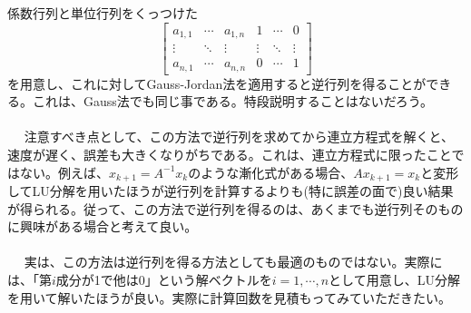 係数行列と単位行列をくっつけた
\begin{equation}
\left[
\begin{array}{ccc|ccc}
a_{1,1}&\cdots&a_{1,n}&1&\cdots&0\\
\vdots&\ddots&\vdots&\vdots&\ddots&\vdots\\
a_{n,1}&\cdots&a_{n,n}&0&\cdots&1
\end{array}\right]
\end{equation}
を用意し、これに対してGauss-Jordan法を適用すると逆行列を得ることができる。これは、Gauss法でも同じ事である。特段説明することはないだろう。
\\ \\　
注意すべき点として、この方法で逆行列を求めてから連立方程式を解くと、速度が遅く、誤差も大きくなりがちである。これは、連立方程式に限ったことではない。例えば、$x_{k+1}=A^{-1}x_k$のような漸化式がある場合、$Ax_{k+1}=x_k$と変形してLU分解を用いたほうが逆行列を計算するよりも(特に誤差の面で)良い結果が得られる。従って、この方法で逆行列を得るのは、あくまでも逆行列そのものに興味がある場合と考えて良い。
\\ \\　
実は、この方法は逆行列を得る方法としても最適のものではない。実際には、「第$i$成分が1で他は0」という解ベクトルを$i=1,\cdots,n$として用意し、LU分解を用いて解いたほうが良い。実際に計算回数を見積もってみていただきたい。

\newpage

